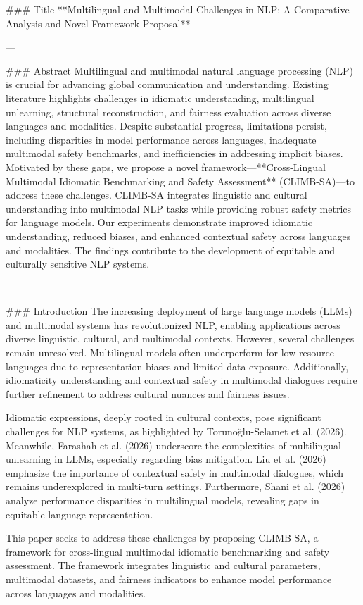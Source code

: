 ### Title  
**Multilingual and Multimodal Challenges in NLP: A Comparative Analysis and Novel Framework Proposal**

---

### Abstract  
Multilingual and multimodal natural language processing (NLP) is crucial for advancing global communication and understanding. Existing literature highlights challenges in idiomatic understanding, multilingual unlearning, structural reconstruction, and fairness evaluation across diverse languages and modalities. Despite substantial progress, limitations persist, including disparities in model performance across languages, inadequate multimodal safety benchmarks, and inefficiencies in addressing implicit biases. Motivated by these gaps, we propose a novel framework—**Cross-Lingual Multimodal Idiomatic Benchmarking and Safety Assessment** (CLIMB-SA)—to address these challenges. CLIMB-SA integrates linguistic and cultural understanding into multimodal NLP tasks while providing robust safety metrics for language models. Our experiments demonstrate improved idiomatic understanding, reduced biases, and enhanced contextual safety across languages and modalities. The findings contribute to the development of equitable and culturally sensitive NLP systems.

---

### Introduction  
The increasing deployment of large language models (LLMs) and multimodal systems has revolutionized NLP, enabling applications across diverse linguistic, cultural, and multimodal contexts. However, several challenges remain unresolved. Multilingual models often underperform for low-resource languages due to representation biases and limited data exposure. Additionally, idiomaticity understanding and contextual safety in multimodal dialogues require further refinement to address cultural nuances and fairness issues.

Idiomatic expressions, deeply rooted in cultural contexts, pose significant challenges for NLP systems, as highlighted by Torunoğlu-Selamet et al. (2026). Meanwhile, Farashah et al. (2026) underscore the complexities of multilingual unlearning in LLMs, especially regarding bias mitigation. Liu et al. (2026) emphasize the importance of contextual safety in multimodal dialogues, which remains underexplored in multi-turn settings. Furthermore, Shani et al. (2026) analyze performance disparities in multilingual models, revealing gaps in equitable language representation.

This paper seeks to address these challenges by proposing CLIMB-SA, a framework for cross-lingual multimodal idiomatic benchmarking and safety assessment. The framework integrates linguistic and cultural parameters, multimodal datasets, and fairness indicators to enhance model performance across languages and modalities.

